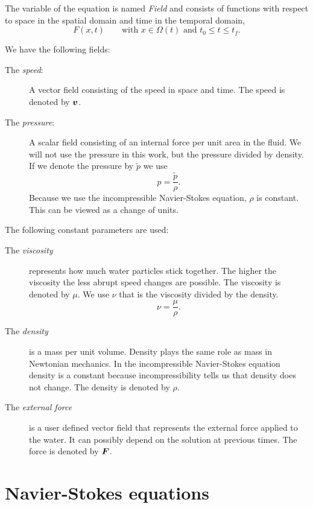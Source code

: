 The variable of the equation is named \emph{Field} and consists of functions with respect to space in the spatial domain and time in the temporal domain,
\begin{equation}
 F(x,t)\qquad \text{with $x\in\Omega(t)$ and $t_0\leq t \leq t_f$.}
\end{equation}

We have the following fields:
\begin{description}
\item[The \emph{speed}:] A vector field consisting of the speed in space and time.
The speed is denoted by ${\boldsymbol {v}}$.
\item[The \emph{pressure}:] A scalar field consisting of an internal force per unit area in the fluid.
We will not use the pressure in this work, but the pressure divided by density.
If we denote the pressure by $\tilde{p}$ we use
\begin{equation}
 p=\frac{\tilde{p}}{\rho}.
\end{equation}
Because we use the incompressible Navier-Stokes equation, $\rho$ is constant. This can be viewed as a change of units.
\end{description}

The following constant parameters are used:
\begin{description}
\item[The \emph{viscosity}] represents how much water particles stick together.
The higher the viscosity the less abrupt speed changes are possible.
The viscosity is denoted by $\mu$. We use $\nu$ that is the viscosity divided by the density.
\begin{equation}
 \nu=\frac{\mu}{\rho}.
\end{equation}
\item[The \emph{density}] is a mass per unit volume.
Density plays the same role as mass in Newtonian mechanics.
In the incompressible Navier-Stokes equation density is a constant because incompressibility tells us that density does not change.
The density is denoted by $\rho$.
\item[The \emph{external force}] is a user defined vector field that represents the external force applied to the water.
It can possibly depend on the solution at previous times.
The force is denoted by ${\boldsymbol {F}}$.
\end{description}

\section{Navier-Stokes equations}

